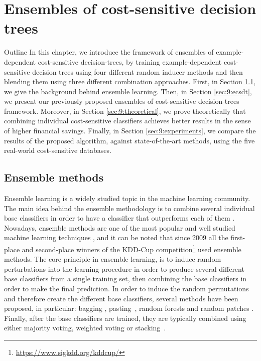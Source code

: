 \chapter{Ensembles of cost-sensitive decision trees}\label{ch:9}

\begin{remark}{Outline}
In this chapter, we introduce the framework of ensembles of example-dependent cost-sensitive 
decision-trees, by training example-dependent cost-sensitive decision trees using four different 
random inducer methods and then blending them using three different combination approaches.
First, in Section \ref{sec:9:ensemble}, we give the background behind ensemble learning. Then, in 
Section \ref{sec:9:ecsdt}, we present our previously proposed ensembles of cost-sensitive 
decision-trees framework. Moreover, in Section \ref{sec:9:theoretical}, we prove theoretically that 
combining individual cost-sensitive classifiers achieves better  results in the sense of higher 
financial savings. Finally, in Section \ref{sec:9:experiments}, we compare the results of the 
proposed algorithm, against state-of-the-art methods, using the five real-world cost-sensitive 
databases.
\end{remark}

\section{Ensemble methods}
\label{sec:9:ensemble}

Ensemble learning is a widely studied topic in the machine learning community. The main idea behind 
the ensemble methodology is to combine several individual base classifiers in   order to have a 
classifier that outperforms each of them \citep{Rokach2009}. Nowadays,   ensemble methods are  one 
of the most popular and well studied machine learning techniques   \citep{Zhou2012}, and it can be 
noted that since 2009 all the first-place and   second-place winners of the KDD-Cup 
competition\footnote{\url{https://www.sigkdd.org/kddcup/}}   used  ensemble methods. The core 
principle in ensemble learning, is to induce random perturbations into  the learning procedure in 
order to produce several different base classifiers from a single  training set, then combining the 
base classifiers in order to make the final prediction.  In order to induce the random permutations 
and therefore create the different base classifiers,   several methods have been proposed, in 
particular: bagging \citep{Breiman1996},   pasting~\citep{Breiman1999}, random forests 
\citep{Breiman2001} and random patches   \citep{Louppe2012}. Finally, after  the base   classifiers 
are trained, they are typically   combined using either   majority voting,  weighted  voting    or  
stacking~\citep{Zhou2012}.

